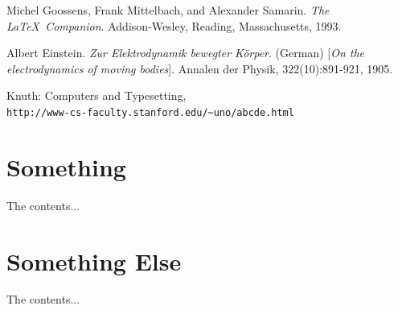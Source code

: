 \documentclass[a4paper]{article}
\begin{document}
\newpage
{}
\begin{thebibliography}{9}
Michel Goossens, Frank Mittelbach, and Alexander Samarin. 
\textit{The \LaTeX\ Companion}. 
Addison-Wesley, Reading, Massachusetts, 1993.
 
Albert Einstein. 
\textit{Zur Elektrodynamik bewegter K{\"o}rper}. (German) 
[\textit{On the electrodynamics of moving bodies}]. 
Annalen der Physik, 322(10):891-921, 1905.
 
Knuth: Computers and Typesetting,
\\\texttt{http://www-cs-faculty.stanford.edu/\~{}uno/abcde.html}

\end{thebibliography}
\newpage

\begin{appendices}
\section{Something}
The contents...

\newpage
\section{Something Else}
The contents...
\end{appendices}
\end{document}
